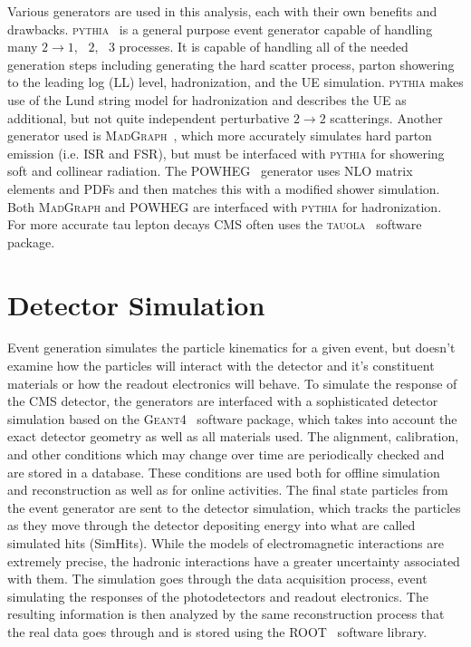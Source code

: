 Various generators are used in this analysis, each with their own benefits and drawbacks. \textsc{pythia}~\cite{1126-6708-2006-05-026} is a general purpose event generator capable of handling many $2\rightarrow1,\text{ }2,\text{ }3$ processes.
It is capable of handling all of the needed generation steps including generating the hard scatter process, parton showering to the leading log (LL) level, hadronization, and the UE simulation. \textsc{pythia} makes use of the Lund string model for hadronization and describes the UE as additional, but not quite independent perturbative $2\rightarrow2$ scatterings. 
Another generator used is \textsc{Mad}\textsc{Graph}~\cite{Alwall:2014hca}, which more accurately simulates hard parton emission (i.e. ISR and FSR), but must be interfaced with \textsc{pythia} for showering soft and collinear radiation.
The \textsc{POWHEG}~\cite{Nason:2004rx,Alioli:2010xd} generator uses NLO matrix elements and PDFs and then matches this with a modified shower simulation.
Both \textsc{Mad}\textsc{Graph} and \textsc{POWHEG} are interfaced with \textsc{pythia} for hadronization.
For more accurate tau lepton decays CMS often uses the \textsc{tauola}~\cite{WAS200196} software package.

\section{Detector Simulation}
\label{sec:detector_simulation}

Event generation simulates the particle kinematics for a given event, but doesn't examine how the particles will interact with the detector and it's constituent materials or how the readout electronics will behave.
To simulate the response of the CMS detector, the generators are interfaced with a sophisticated detector simulation based on the \textsc{Geant4}~\cite{geant4nim,geant4ieee} software package, which takes into account the exact detector geometry as well as all materials used.
The alignment, calibration, and other conditions which may change over time are periodically checked and are stored in a database.
These conditions are used both for offline simulation and reconstruction as well as for online activities.
The final state particles from the event generator are sent to the detector simulation, which tracks the particles as they move through the detector depositing energy into what are called simulated hits (SimHits).
While the models of electromagnetic interactions are extremely precise, the hadronic interactions have a greater uncertainty associated with them.
The simulation goes through the data acquisition process, event simulating the responses of the photodetectors and readout electronics.
The resulting information is then analyzed by the same reconstruction process that the real data goes through and is stored using the ROOT~\cite{Brun199781} software library.